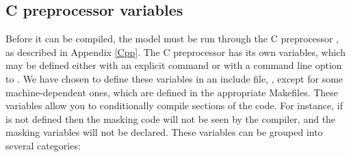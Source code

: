 \subsection{C preprocessor variables}
\label{Cpp1}
Before it can be compiled, the model must be run through the C
preprocessor , as described in Appendix \ref{Cpp}.  The C
preprocessor has its own variables, which may be defined either with an
explicit  command or with a command line option to
.  We have chosen to define these variables in an include
file, , except for some
machine-dependent ones, which are defined in the appropriate Makefiles.
These variables allow you to conditionally compile sections of the
code.  For instance, if  is not defined then the masking
code will not be seen by the compiler, and the masking variables will
not be declared.  These  variables can be grouped into
several categories:
